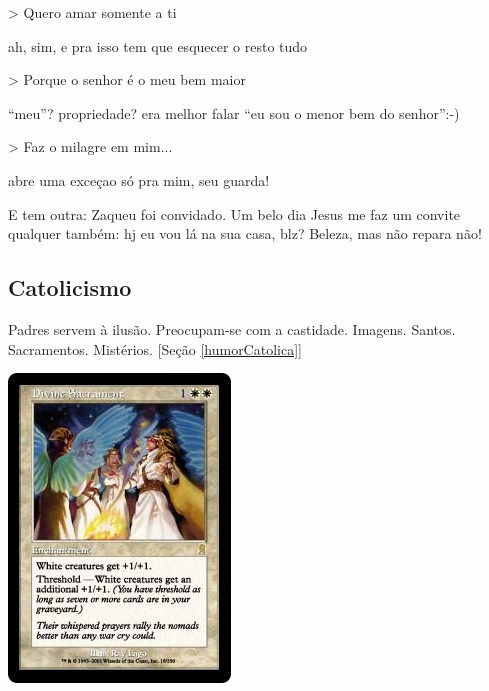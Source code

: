 \documentclass[12pt,a4paper]{article}
\begin{document}
> Quero amar somente a ti

ah, sim, e pra isso tem que esquecer o resto tudo

> Porque o senhor \'e o meu bem maior

\textquotedblleft meu\textquotedblright? propriedade? era melhor falar \textquotedblleft eu sou o menor bem do senhor\textquotedblright :-)

> Faz o milagre em mim...

abre uma exce\c{c}ao s\'o pra mim, seu guarda!

			\begin{flushright}
			\end{flushright}

E tem outra: Zaqueu foi convidado. Um belo dia Jesus me faz um convite qualquer tamb\'em: hj eu vou l\'a na sua casa, blz? Beleza, mas n\~ao repara n\~ao!

		\subsection{Catolicismo}\label{catolicismo}
			\begin{flushright}
			\end{flushright}

			Padres servem \`a ilus\~ao. Preocupam-se com a castidade. Imagens. Santos. Sacramentos. Mist\'erios. [Se\c{c}\~ao \ref{humorCatolica}]

			\begin{center}
			\includegraphics{sacrament}
			\end{center}

			\begin{flushright}
			\end{flushright}
\end{document}
